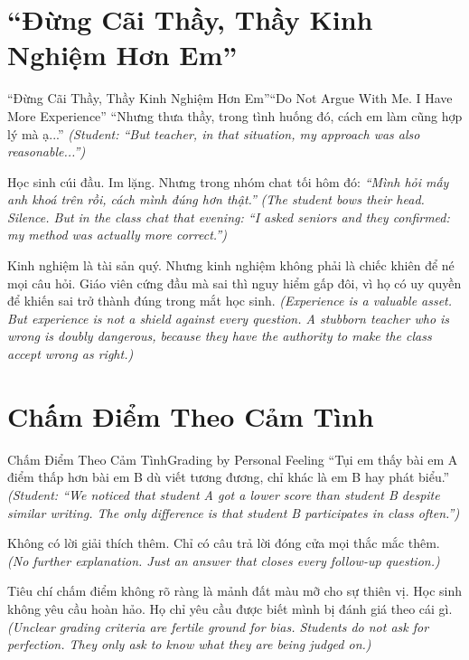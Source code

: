 \section{``Đừng Cãi Thầy, Thầy Kinh Nghiệm Hơn Em''}
\begin{truyen}{``Đừng Cãi Thầy, Thầy Kinh Nghiệm Hơn Em''}{``Do Not Argue With Me. I Have More Experience''}
 ``Nhưng thưa thầy, trong tình huống đó, cách em làm cũng hợp lý mà ạ...''
\textit{(Student: ``But teacher, in that situation, my approach was also reasonable...'')}


Học sinh cúi đầu. Im lặng. Nhưng trong nhóm chat tối hôm đó: \textit{``Mình hỏi mấy anh khoá trên rồi, cách mình đúng hơn thật.''} 
\textit{(The student bows their head. Silence. But in the class chat that evening: ``I asked seniors and they confirmed: my method was actually more correct.'')}

\begin{baihoc}
Kinh nghiệm là tài sản quý. Nhưng kinh nghiệm không phải là chiếc khiên để né mọi câu hỏi. Giáo viên cứng đầu mà sai thì nguy hiểm gấp đôi, vì họ có uy quyền để khiến sai trở thành đúng trong mắt học sinh.
\textit{(Experience is a valuable asset. But experience is not a shield against every question. A stubborn teacher who is wrong is doubly dangerous, because they have the authority to make the class accept wrong as right.)}
\end{baihoc}
\end{truyen}

\section{Chấm Điểm Theo Cảm Tình}
\begin{truyen}{Chấm Điểm Theo Cảm Tình}{Grading by Personal Feeling}
 ``Tụi em thấy bài em A điểm thấp hơn bài em B dù viết tương đương, chỉ khác là em B hay phát biểu.''
\textit{(Student: ``We noticed that student A got a lower score than student B despite similar writing. The only difference is that student B participates in class often.'')}


Không có lời giải thích thêm. Chỉ có câu trả lời đóng cửa mọi thắc mắc thêm.
\textit{(No further explanation. Just an answer that closes every follow-up question.)}

\begin{baihoc}
Tiêu chí chấm điểm không rõ ràng là mảnh đất màu mỡ cho sự thiên vị. Học sinh không yêu cầu hoàn hảo. Họ chỉ yêu cầu được biết mình bị đánh giá theo cái gì.
\textit{(Unclear grading criteria are fertile ground for bias. Students do not ask for perfection. They only ask to know what they are being judged on.)}
\end{baihoc}
\end{truyen}


